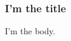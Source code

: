 \documentclass{curatedCoursesBeamer}
\begin{document}
\begin{frame}
\frametitle{I'm the title}

I'm the body.
\end{frame}
\end{document}
